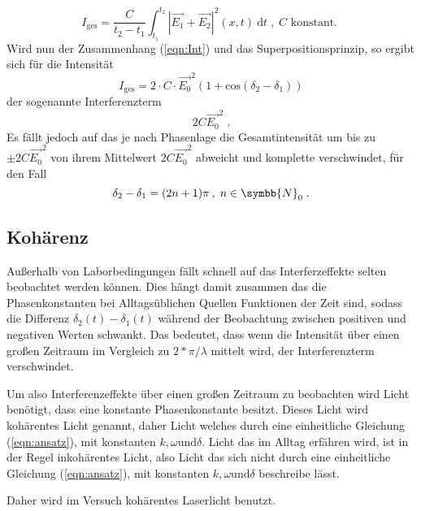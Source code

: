 \begin{equation}
    I_\text{ges} = \frac{C}{t_2 - t_1} \int^{t_2}_{t_1} |\vec{E_1} + \vec{E_2}|^2 (x, t) \: \text{d}t 
    \; , \; C \text{ konstant. } 
\end{equation}
\noindent
Wird nun der Zusammenhang (\ref{eqn:Int}) und das Superpositionsprinzip, so ergibt sich für die Intensität 
\begin{equation*}
    I_\text{ges} = 2 \cdot C \cdot \vec{E_0}^2 (1 + \text{cos}(\delta_2 - \delta_1))
\end{equation*}
\noindent 
der sogenannte Interferenzterm 
\begin{equation*}
    2 C \vec{E_0}^2 \; .
\end{equation*}
\noindent 
Es fällt jedoch auf das je nach Phasenlage die Gesamtintensität um bis zu $\pm 2 C \vec{E_0}^2$ von ihrem Mittelwert $2 C \vec{E_0}^2$ abweicht und komplette verschwindet, für
den Fall 
\begin{equation}
    \delta_2 - \delta_1 = (2n + 1)\pi \: , \; n \in \symbb{N}_0 \; .
\end{equation}

\subsection{Kohärenz}
Außerhalb von Laborbedingungen fällt schnell auf das Interferzeffekte selten beobachtet werden können. Dies hängt damit zusammen das die Phasenkonstanten bei Alltagsüblichen Quellen 
Funktionen der Zeit sind, sodass die Differenz $\delta_2(t) - \delta_1(t)$ während der Beobachtung zwischen positiven und negativen Werten schwankt. Das bedeutet, dass wenn die
Intensität über einen großen Zeitraum im Vergleich zu $2*\pi/\lambda$ mittelt wird, der Interferenzterm verschwindet.

Um also Interferenzeffekte über einen großen Zeitraum zu beobachten wird Licht benötigt, dass eine konstante Phasenkonstante besitzt. Dieses Licht wird kohärentes Licht genannt, daher 
Licht welches durch eine einheitliche Gleichung (\ref{eqn:ansatz}), mit konstanten $k, \omega \text{und} \delta$. Licht das im Alltag erfähren wird, ist in der Regel inkohärentes Licht,
also Licht das sich nicht durch eine einheitliche Gleichung (\ref{eqn:ansatz}), mit konstanten $k, \omega \text{und} \delta$ beschreibe lässt.
\noindent

Daher wird im Versuch kohärentes Laserlicht benutzt.

